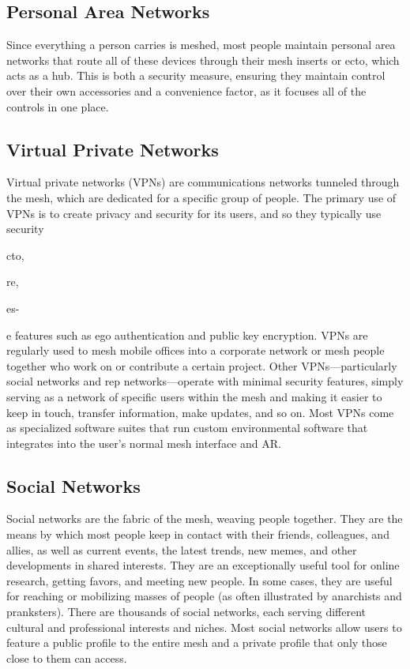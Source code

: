 \subsection{Personal Area Networks}

Since everything a person carries is meshed, most 
people maintain personal area networks that route 
all of these devices through their mesh inserts or ecto, 
which acts as a hub. This is both a security measure, 
ensuring they maintain control over their own accessories
and a convenience factor, as it focuses all of the
controls in one place.

\subsection{Virtual Private Networks}

Virtual private networks (VPNs) are communications
networks tunneled through the mesh, which
are dedicated for a specific group of people. The 
primary use of VPNs is to create privacy and security
for its users, and so they typically use security

cto,

re, 

es-

e
features such as ego authentication and public key 
encryption. VPNs are regularly used to mesh mobile 
offices into a corporate network or mesh people together
who work on or contribute a certain project.
Other VPNs—particularly social networks and rep 
networks—operate with minimal security features, 
simply serving as a network of specific users within 
the mesh and making it easier to keep in touch, 
transfer information, make updates, and so on. Most 
VPNs come as specialized software suites that run 
custom environmental software that integrates into 
the user's normal mesh interface and AR.

\subsection{Social Networks}

Social networks are the fabric of the mesh, weaving 
people together. They are the means by which most 
people keep in contact with their friends, colleagues, 
and allies, as well as current events, the latest trends, 
new memes, and other developments in shared 
interests. They are an exceptionally useful tool for 
online research, getting favors, and meeting new 
people. In some cases, they are useful for reaching 
or mobilizing masses of people (as often illustrated 
by anarchists and pranksters). There are thousands 
of social networks, each serving different cultural 
and professional interests and niches. Most social 
networks allow users to feature a public profile to 
the entire mesh and a private profile that only those 
close to them can access.

